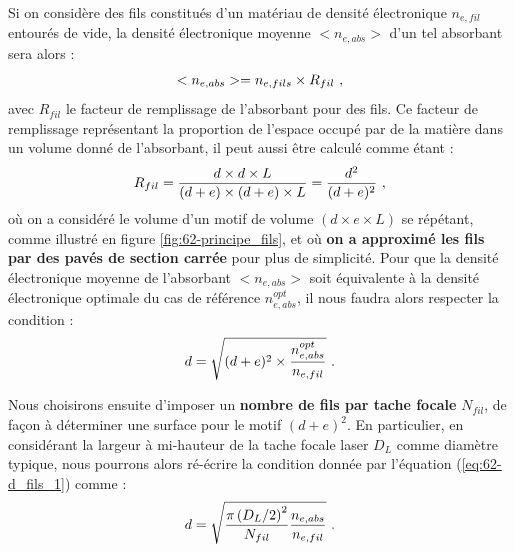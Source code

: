 \begin{refsection}
Si on considère des fils constitués d'un matériau de densité électronique $n_{e,fil}$ entourés de vide, la densité électronique moyenne $<n_{e,abs}>$ d'un tel absorbant sera alors :
\begin{equation}
    <n_{e,abs}> = n_{e,fils} \times R_{fil} ~ \rm ,
\end{equation}
avec $R_{fil}$ le facteur de remplissage de l'absorbant pour des fils. Ce facteur de remplissage représentant la proportion de l'espace occupé par de la matière dans un volume donné de l'absorbant, il peut aussi être calculé comme étant :
\begin{equation}
    R_{fil}=\dfrac{d \times d \times L}{(d+e) \times (d+e) \times L} = \dfrac{d^2}{(d+e)^2} ~ \rm,
\end{equation}
où on a considéré le volume d'un motif de volume $(d \times e \times L)$ se répétant, comme illustré en figure \ref{fig:62-principe_fils}, et où \textbf{on a approximé les fils par des pavés de section carrée} pour plus de simplicité.
Pour que la densité électronique moyenne de l'absorbant $<n_{e,abs}>$ soit équivalente à la densité électronique optimale du cas de référence $n_{e,abs}^{opt}$, il nous faudra alors respecter la condition :
\begin{equation}
    d = \sqrt{(d+e)^2 \times \dfrac{n_{e,abs}^{opt}}{n_{e,fil}}} ~ \rm .
    \label{eq:62-d_fils_1}
\end{equation}

Nous choisirons ensuite d'imposer un \textbf{nombre de fils par tache focale} $N_{fil}$, de façon à déterminer une surface pour le motif $(d+e)^2$. En particulier, en considérant la largeur à mi-hauteur de la tache focale laser $D_L$ comme diamètre typique, nous pourrons alors ré-écrire la condition donnée par l'équation (\ref{eq:62-d_fils_1}) comme :
\begin{equation}
    d = \sqrt{\dfrac{\pi \left(D_L/2\right)^2}{N_{fil}}\dfrac{n_{e,abs}}{n_{e,fil}}} ~ \rm .
\label{eq:62-d_fils_2}
\end{equation}


\end{refsection}
